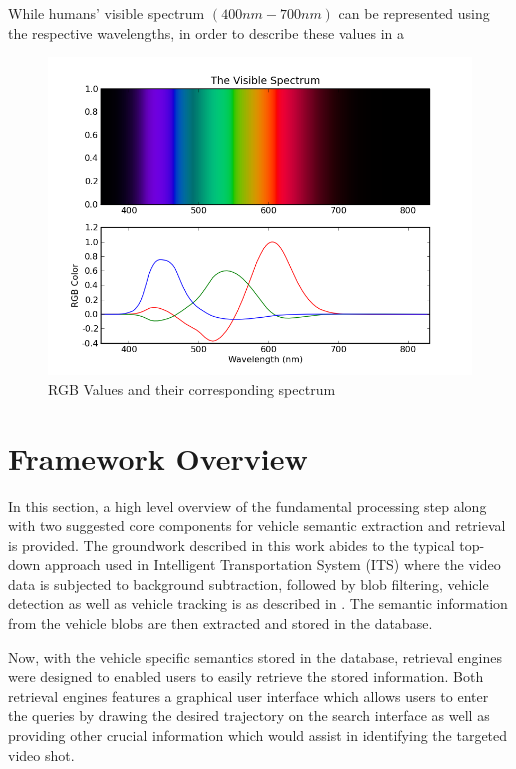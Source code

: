 While humans' visible spectrum $(400nm - 700nm)$ can be represented using the respective wavelengths,  in order to describe these values in a 


\begin{figure}[hbt!]\centering
\includegraphics[width=.7\textwidth]{image/general/VisibleSpectrum.png}
\caption{RGB Values and their corresponding spectrum}
\label{fig:visibleSpectrum}
\end{figure}


\section{Framework Overview}
\label{section:framework}
In this section, a high level overview of the fundamental processing step along with two suggested core components for vehicle semantic extraction and retrieval is provided. The groundwork described in this work abides to the typical top-down approach used in Intelligent Transportation System (ITS) where the video data is subjected to background subtraction, followed by blob filtering, vehicle detection as well as vehicle tracking is as described in \cite{lim2017}. The semantic information from the vehicle blobs are then extracted and stored in the database. 

Now, with the vehicle specific semantics stored in the database, retrieval engines were designed to enabled users to easily retrieve the stored information. Both retrieval engines features a graphical user interface which allows users to enter the queries by drawing the desired trajectory on the search interface as well as providing other crucial information which would assist in identifying the targeted video shot.


